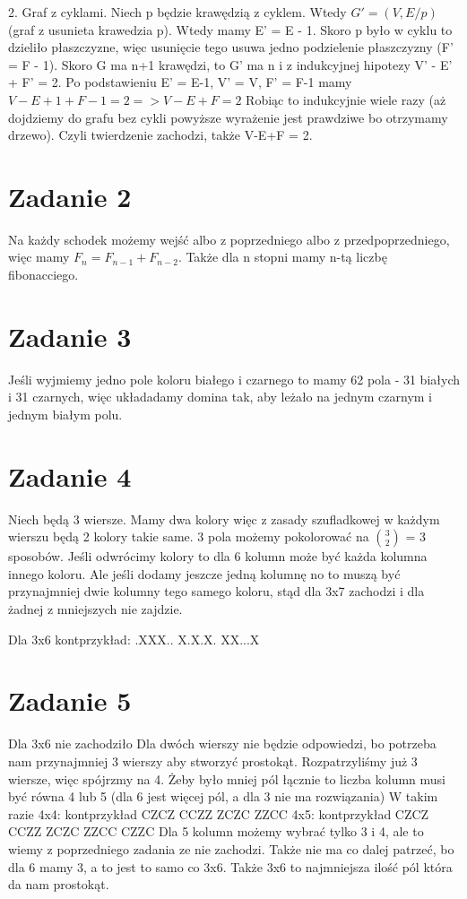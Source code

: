 \documentclass[12pt]{article}
\begin{document}
2. Graf z cyklami. Niech p będzie krawędzią z cyklem. Wtedy $G' = (V, E/p)$ (graf z usunieta krawedzia p). Wtedy mamy E' = E - 1. Skoro p było w cyklu to dzieliło płaszczyzne, więc usunięcie tego usuwa jedno podzielenie płaszczyzny (F' = F - 1). Skoro G ma n+1 krawędzi, to G' ma n i z indukcyjnej hipotezy V' - E' + F' = 2. Po podstawieniu E' = E-1, V' = V, F' = F-1 mamy 
$V - E+1 + F-1 = 2 => V - E + F = 2$ 
Robiąc to indukcyjnie wiele razy (aż dojdziemy do grafu bez cykli powyższe wyrażenie jest prawdziwe bo otrzymamy drzewo).
Czyli twierdzenie zachodzi, także V-E+F = 2.


\section{Zadanie 2}
Na każdy schodek możemy wejść albo z poprzedniego albo z przedpoprzedniego, więc mamy $F_n = F_{n-1} + F_{n-2}$.
Także dla n stopni mamy n-tą liczbę fibonacciego.
\section{Zadanie 3}
Jeśli wyjmiemy jedno pole koloru białego i czarnego to mamy 62 pola - 31 białych i 31 czarnych, więc układadamy domina tak, aby leżało na jednym czarnym i jednym białym polu.
\section{Zadanie 4}
Niech będą 3 wiersze.
Mamy dwa kolory więc z zasady szufladkowej w każdym wierszu będą 2 kolory takie same.  
3 pola możemy pokolorować na $\binom{3}{2}$ = 3 sposobów. 
Jeśli odwrócimy kolory to dla 6 kolumn może być każda kolumna innego koloru.
Ale jeśli dodamy jeszcze jedną kolumnę no to muszą być przynajmniej dwie kolumny tego samego koloru, stąd dla 3x7 zachodzi i dla żadnej z mniejszych nie zajdzie.

Dla 3x6 kontprzykład:
.XXX..
X.X.X.
XX...X
\section{Zadanie 5}
Dla 3x6 nie zachodziło 
Dla dwóch wierszy nie będzie odpowiedzi, bo potrzeba nam przynajmniej 3 wierszy aby stworzyć prostokąt. Rozpatrzyliśmy już 3 wiersze, więc spójrzmy na 4.
Żeby było mniej pól łącznie to liczba kolumn musi być równa 4 lub 5 (dla 6 jest więcej pól, a dla 3 nie ma rozwiązania)
W takim razie 4x4:
kontprzykład
CZCZ 
CCZZ 
ZCZC
ZZCC
4x5:
kontprzykład
CZCZ 
CCZZ 
ZCZC
ZZCC
CZZC 
Dla 5 kolumn możemy wybrać tylko 3 i 4, ale to wiemy z poprzedniego zadania ze nie zachodzi. Także nie ma co dalej patrzeć, bo dla 6 mamy 3, a to jest to samo co 3x6.
Także 3x6 to najmniejsza ilość pól która da nam prostokąt. 
\end{document}
